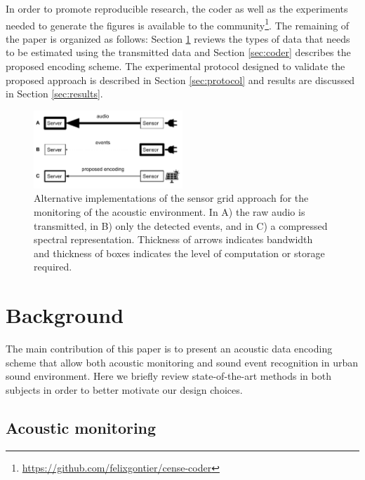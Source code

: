 \documentclass[sensors,article,submit,moreauthors,pdftex,10pt,a4paper]{mdpi}
\begin{document}
In order to promote reproducible research, the coder as well as the experiments needed to generate the figures is available to the community\footnote{\url{https://github.com/felixgontier/cense-coder}}. The remaining of the paper is organized as follows: Section \ref{sec:background} reviews the types of data that needs to be estimated using the transmitted data and Section \ref{sec:coder} describes the proposed encoding scheme. The experimental protocol designed to validate the proposed approach is described in Section \ref{sec:protocol} and results are discussed in Section \ref{sec:results}.

\begin{figure}[h]
\centering
\includegraphics[width=0.5\textwidth]{figures/censeCoder}
\caption{Alternative implementations of the sensor grid approach for the monitoring of the acoustic environment. In A) the raw audio is transmitted, in B) only the detected events, and in C) a compressed spectral representation. Thickness of arrows indicates bandwidth and thickness of boxes indicates the level of computation or storage required.}
\label{fig:codingScheme}
\end{figure}


\section{Background} \label{sec:background}


The main contribution of this paper is to present an acoustic data encoding scheme that allow both acoustic monitoring and sound event recognition in urban sound environment. Here we briefly review state-of-the-art methods in both subjects in order to better motivate our design choices.

\subsection{Acoustic monitoring}
\end{document}
